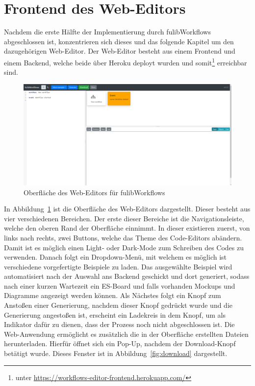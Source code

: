 \section{Frontend des Web-Editors}\label{sec:editor-frontend}
Nachdem die erste Hälfte der Implementierung durch fulibWorkflows abgeschlossen ist, konzentrieren sich dieses und das folgende Kapitel um den dazugehörigen Web-Editor.
Der Web-Editor besteht aus einem Frontend und einem Backend, welche beide über Heroku deployt wurden und somit\footnote{unter \url{https://workflows-editor-frontend.herokuapp.com/}}
erreichbar sind.

\begin{figure}[h]
    \centering
    \includegraphics[width=1.0\textwidth]{images/3.2/workflows-complete}
    \caption{Oberfläche des Web-Editors für fulibWorkflows}
    \label{fig:frontend}
\end{figure}

In Abbildung~\ref{fig:frontend} ist die Oberfläche des Web-Editors dargestellt.
Dieser besteht aus vier verschiedenen Bereichen.
Der erste dieser Bereiche ist die Navigationsleiste, welche den oberen Rand der Oberfläche einnimmt.
In dieser existieren zuerst, von links nach rechts, zwei Buttons, welche das Theme des Code-Editors abändern.
Damit ist es möglich einen Light- oder Dark-Mode zum Schreiben des Codes zu verwenden.
Danach folgt ein Dropdown-Menü, mit welchem es möglich ist verschiedene vorgefertigte Beispiele zu laden.
Das ausgewählte Beispiel wird automatisiert nach der Auswahl ans Backend geschickt und dort generiert, sodass nach einer kurzen Wartezeit ein \ac{ES}-Board und falls
vorhanden Mockups und Diagramme angezeigt werden können.
Als Nächstes folgt ein Knopf zum Anstoßen einer Generierung, nachdem dieser Knopf gedrückt wurde und die Generierung angestoßen ist, erscheint ein Ladekreis in dem Knopf,
um als Indikator dafür zu dienen, dass der Prozess noch nicht abgeschlossen ist.
Die Web-Anwendung ermöglicht es zusätzlich die in der Oberfläche erstellten Dateien herunterladen.
Hierfür öffnet sich ein Pop-Up, nachdem der Download-Knopf betätigt wurde.
Dieses Fenster ist in Abbildung~\ref{fig:download} dargestellt.

